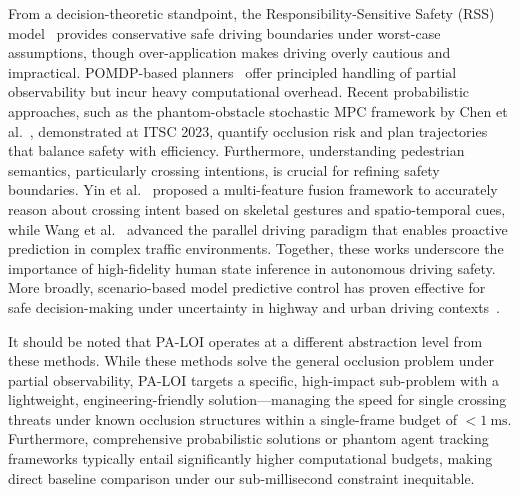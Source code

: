 \documentclass[conference]{IEEEtran}
\begin{document}
From a decision-theoretic standpoint, the Responsibility-Sensitive Safety (RSS) model~\cite{shalev2017rss} provides conservative safe driving boundaries under worst-case assumptions, though over-application makes driving overly cautious and impractical. POMDP-based planners~\cite{zhang2021pomdp} offer principled handling of partial observability but incur heavy computational overhead. Recent probabilistic approaches, such as the phantom-obstacle stochastic MPC framework by Chen et al.~\cite{chen2023quantified}, demonstrated at ITSC 2023, quantify occlusion risk and plan trajectories that balance safety with efficiency. Furthermore, understanding pedestrian semantics, particularly crossing intentions, is crucial for refining safety boundaries. Yin et al.~\cite{yin2026pedestrian} proposed a multi-feature fusion framework to accurately reason about crossing intent based on skeletal gestures and spatio-temporal cues, while Wang et al.~\cite{wang2024parallel} advanced the parallel driving paradigm that enables proactive prediction in complex traffic environments. Together, these works underscore the importance of high-fidelity human state inference in autonomous driving safety. More broadly, scenario-based model predictive control has proven effective for safe decision-making under uncertainty in highway and urban driving contexts~\cite{cesari2017mpc}.

It should be noted that PA-LOI operates at a different abstraction level from these methods. While these methods solve the general occlusion problem under partial observability, PA-LOI targets a specific, high-impact sub-problem with a lightweight, engineering-friendly solution---managing the speed for single crossing threats under known occlusion structures within a single-frame budget of $< \SI{1}{\milli\second}$. Furthermore, comprehensive probabilistic solutions or phantom agent tracking frameworks typically entail significantly higher computational budgets, making direct baseline comparison under our sub-millisecond constraint inequitable.
\end{document}
